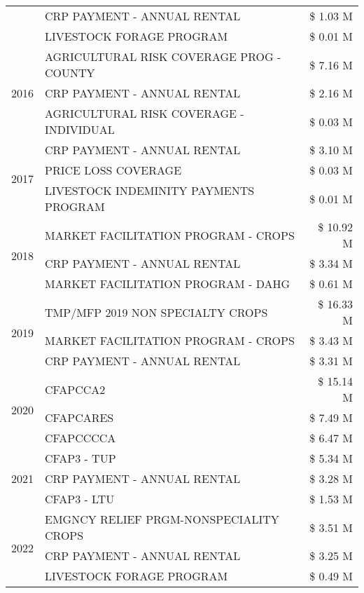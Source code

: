 \begin{tabular}{llr}
 & CRP PAYMENT - ANNUAL RENTAL & \$ 1.03 M \\
 & LIVESTOCK FORAGE PROGRAM & \$ 0.01 M \\
\cline{1-3}
\multirow[t]{3}{*}{2016} & AGRICULTURAL RISK COVERAGE PROG - COUNTY & \$ 7.16 M \\
 & CRP PAYMENT - ANNUAL RENTAL & \$ 2.16 M \\
 & AGRICULTURAL RISK COVERAGE - INDIVIDUAL & \$ 0.03 M \\
\cline{1-3}
\multirow[t]{3}{*}{2017} & CRP PAYMENT - ANNUAL RENTAL & \$ 3.10 M \\
 & PRICE LOSS COVERAGE & \$ 0.03 M \\
 & LIVESTOCK INDEMINITY PAYMENTS PROGRAM & \$ 0.01 M \\
\cline{1-3}
\multirow[t]{3}{*}{2018} & MARKET FACILITATION PROGRAM - CROPS & \$ 10.92 M \\
 & CRP PAYMENT - ANNUAL RENTAL & \$ 3.34 M \\
 & MARKET FACILITATION PROGRAM - DAHG & \$ 0.61 M \\
\cline{1-3}
\multirow[t]{3}{*}{2019} & TMP/MFP 2019 NON SPECIALTY CROPS & \$ 16.33 M \\
 & MARKET FACILITATION PROGRAM - CROPS & \$ 3.43 M \\
 & CRP PAYMENT - ANNUAL RENTAL & \$ 3.31 M \\
\cline{1-3}
\multirow[t]{3}{*}{2020} & CFAPCCA2 & \$ 15.14 M \\
 & CFAPCARES & \$ 7.49 M \\
 & CFAPCCCCA & \$ 6.47 M \\
\cline{1-3}
\multirow[t]{3}{*}{2021} & CFAP3 - TUP & \$ 5.34 M \\
 & CRP PAYMENT - ANNUAL RENTAL & \$ 3.28 M \\
 & CFAP3 - LTU & \$ 1.53 M \\
\cline{1-3}
\multirow[t]{3}{*}{2022} & EMGNCY RELIEF PRGM-NONSPECIALITY CROPS & \$ 3.51 M \\
 & CRP PAYMENT - ANNUAL RENTAL & \$ 3.25 M \\
 & LIVESTOCK FORAGE PROGRAM & \$ 0.49 M \\
\cline{1-3}
\bottomrule
\end{tabular}
